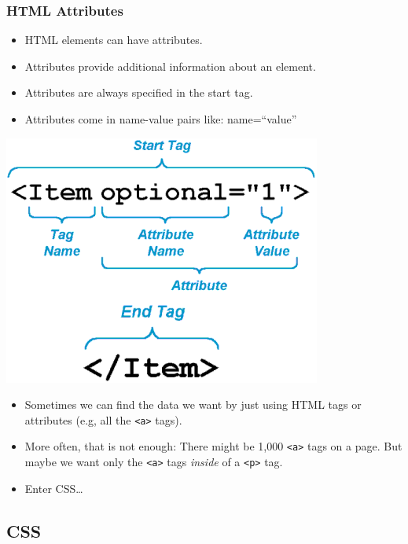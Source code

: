 \documentclass[
]{book}
\providecommand{\tightlist}{%
  \setlength{\itemsep}{0pt}\setlength{\parskip}{0pt}}
\begin{document}
\hypertarget{html-attributes}{%
\subsubsection{HTML Attributes}\label{html-attributes}}

\begin{itemize}
\tightlist
\item
  HTML elements can have attributes.
\item
  Attributes provide additional information about an element.
\item
  Attributes are always specified in the start tag.
\item
  Attributes come in name-value pairs like: name=``value''
\end{itemize}

\begin{center}\includegraphics[width=0.7\linewidth]{img/html-attributes} \end{center}

\begin{itemize}
\tightlist
\item
  Sometimes we can find the data we want by just using HTML tags or attributes (e.g, all the \texttt{\textless{}a\textgreater{}} tags).
\item
  More often, that is not enough: There might be 1,000 \texttt{\textless{}a\textgreater{}} tags on a page. But maybe we want only the \texttt{\textless{}a\textgreater{}} tags \emph{inside} of a \texttt{\textless{}p\textgreater{}} tag.
\item
  Enter CSS\ldots{}
\end{itemize}

\hypertarget{css}{%
\subsection{CSS}\label{css}}
\end{document}
